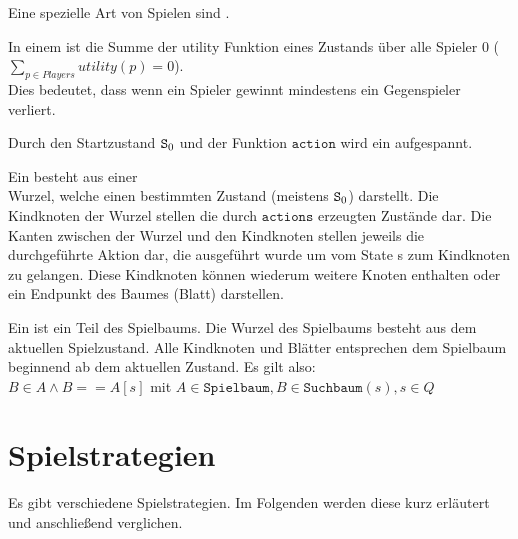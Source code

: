 Eine spezielle Art von Spielen sind .
\begin{Definition}
In einem  ist die Summe der utility Funktion eines Zustands über alle Spieler 0 ($\sum\limits_{p \in Players} utility(p) = 0$).
\\Dies bedeutet, dass wenn ein Spieler gewinnt mindestens ein Gegenspieler verliert.
\end{Definition}
Durch den Startzustand $\mathtt{S\textsubscript{0}}$ und der Funktion $\mathtt{action}$ wird ein  aufgespannt.
\begin{Definition}
Ein  besteht aus einer \\Wurzel, welche einen bestimmten Zustand (meistens $\mathtt{S\textsubscript{0}}$) darstellt. Die Kindknoten der Wurzel stellen die durch $\mathtt{actions}$ erzeugten Zustände dar. Die Kanten zwischen der Wurzel und den Kindknoten stellen jeweils die durchgeführte Aktion dar, die ausgeführt wurde um vom State s zum Kindknoten zu gelangen. Diese Kindknoten können wiederum weitere Knoten enthalten oder ein Endpunkt des Baumes (Blatt)  darstellen.
\end{Definition}
\begin{Definition}
Ein  ist ein Teil des Spielbaums. Die Wurzel des Spielbaums besteht aus dem aktuellen Spielzustand. Alle Kindknoten und Blätter entsprechen dem Spielbaum beginnend ab dem aktuellen Zustand. Es gilt also:
\\ $B \in A \wedge B == A[s]$ mit $ A \in \mathtt{Spielbaum}, B \in \mathtt{Suchbaum}(s), s \in Q$
\end{Definition}
\section{Spielstrategien}
Es gibt verschiedene Spielstrategien. Im Folgenden werden diese kurz erläutert und anschließend verglichen.
